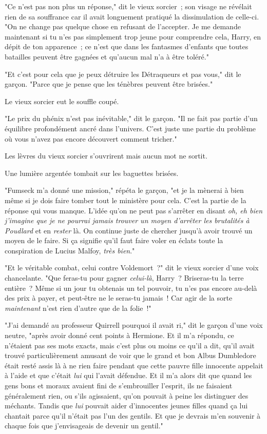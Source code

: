 "Ce n'est pas non plus un réponse," dit le vieux sorcier~; son visage ne révélait rien de sa souffrance car il avait longuement pratiqué la dissimulation de celle-ci. "On ne change pas quelque chose en refusant de l'accepter. Je me demande maintenant si tu n'es pas simplement trop jeune pour comprendre cela, Harry, en dépit de ton apparence~; ce n'est que dans les fantasmes d'enfants que toutes batailles peuvent être gagnées et qu'aucun mal n'a à être toléré."

"Et c'est pour cela que je peux détruire les Détraqueurs et pas vous," dit le garçon. "Parce que je pense que les ténèbres peuvent être brisées."

Le vieux sorcier eut le souffle coupé.

"Le prix du phénix n'est pas inévitable," dit le garçon. "Il ne fait pas partie d'un équilibre profondément ancré dans l'univers. C'est juste une partie du problème où vous n'avez pas encore découvert comment tricher."

Les lèvres du vieux sorcier s'ouvrirent mais aucun mot ne sortit.

Une lumière argentée tombait sur les baguettes brisées.

"Fumseck m'a donné une mission," répéta le garçon, "et je la mènerai à bien même si je dois faire tomber tout le ministère pour cela. C'est la partie de la réponse qui vous manque. L'idée qu'on ne peut pas s'arrêter en disant \emph{oh, eh bien j'imagine que je ne pourrai jamais trouver un moyen d'arrêter les brutalités à Poudlard} et en \emph{rester} là. On continue juste de chercher jusqu'à avoir trouvé un moyen de le faire. Si ça signifie qu'il faut faire voler en éclats toute la conspiration de Lucius Malfoy, \emph{très bien}."

"Et le véritable combat, celui contre Voldemort~?" dit le vieux sorcier d'une voix chancelante. "Que feras-tu pour gagner \emph{celui-là}, Harry~? Briseras-tu la terre entière~? Même si un jour tu obtenais un tel pouvoir, tu n'es pas encore au-delà des prix à payer, et peut-être ne le seras-tu jamais~! Car agir de la sorte \emph{maintenant} n'est rien d'autre que de la folie~!"

"J'ai demandé au professeur Quirrell pourquoi il avait ri," dit le garçon d'une voix neutre, "après avoir donné cent points à Hermione. Et il m'a répondu, ce n'étaient pas ses mots exacts, mais c'est plus ou moins ce qu'il a dit, qu'il avait trouvé particulièrement amusant de voir que le grand et bon Albus Dumbledore était resté assis là à ne rien faire pendant que cette pauvre fille innocente appelait à l'aide et que c'était \emph{lui} qui l'avait défendue. Et il m'a alors dit que quand les gens bons et moraux avaient fini de s'embrouiller l'esprit, ils ne faisaient généralement rien, ou s'ils agissaient, qu'on pouvait à peine les distinguer des méchants. Tandis que \emph{lui} pouvait aider d'innocentes jeunes filles quand ça lui chantait parce qu'il n'était pas l'un des gentils. Et que je devrais m'en souvenir à chaque fois que j'envisageais de devenir un gentil."

